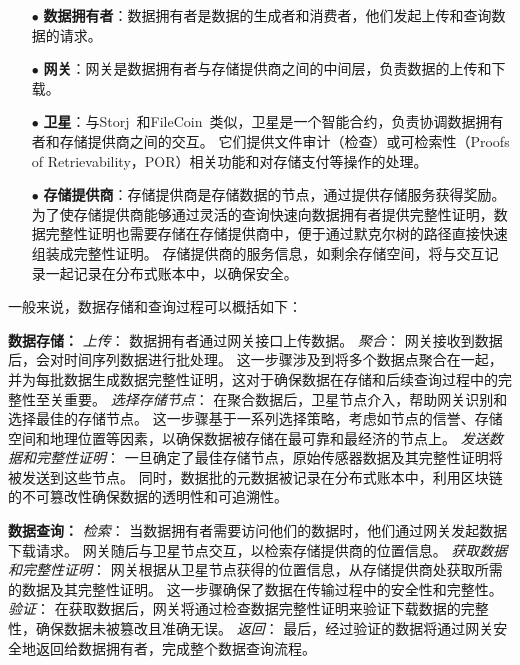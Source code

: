 \begin{itemize}
    \item[$\bullet$] \textbf{数据拥有者}：数据拥有者是数据的生成者和消费者，他们发起上传和查询数据的请求。
    \item[$\bullet$] \textbf{网关}：网关是数据拥有者与存储提供商之间的中间层，负责数据的上传和下载。
    \item[$\bullet$] \textbf{卫星}：与Storj~\cite{storj2018storj}和FileCoin~\cite{bauer2022filecoin}类似，卫星是一个智能合约，负责协调数据拥有者和存储提供商之间的交互。
    它们提供文件审计（检查）或可检索性（Proofs of Retrievability，POR）相关功能和对存储支付等操作的处理。
    \item[$\bullet$] \textbf{存储提供商}：存储提供商是存储数据的节点，通过提供存储服务获得奖励。
    为了使存储提供商能够通过灵活的查询快速向数据拥有者提供完整性证明，数据完整性证明也需要存储在存储提供商中，便于通过默克尔树的路径直接快速组装成完整性证明。
    存储提供商的服务信息，如剩余存储空间，将与交互记录一起记录在分布式账本中，以确保安全。
\end{itemize}

一般来说，数据存储和查询过程可以概括如下：

\textbf{数据存储：}
\textit{上传}：
数据拥有者通过网关接口上传数据。
\textit{聚合}：
网关接收到数据后，会对时间序列数据进行批处理。
这一步骤涉及到将多个数据点聚合在一起，并为每批数据生成数据完整性证明，这对于确保数据在存储和后续查询过程中的完整性至关重要。
\textit{选择存储节点}：
在聚合数据后，卫星节点介入，帮助网关识别和选择最佳的存储节点。
这一步骤基于一系列选择策略，考虑如节点的信誉、存储空间和地理位置等因素，以确保数据被存储在最可靠和最经济的节点上。
\textit{发送数据和完整性证明}：
一旦确定了最佳存储节点，原始传感器数据及其完整性证明将被发送到这些节点。
同时，数据批的元数据被记录在分布式账本中，利用区块链的不可篡改性确保数据的透明性和可追溯性。

\textbf{数据查询：}
\textit{检索}：
当数据拥有者需要访问他们的数据时，他们通过网关发起数据下载请求。
网关随后与卫星节点交互，以检索存储提供商的位置信息。
\textit{获取数据和完整性证明}：
网关根据从卫星节点获得的位置信息，从存储提供商处获取所需的数据及其完整性证明。
这一步骤确保了数据在传输过程中的安全性和完整性。
\textit{验证}：
在获取数据后，网关将通过检查数据完整性证明来验证下载数据的完整性，确保数据未被篡改且准确无误。
\textit{返回}：
最后，经过验证的数据将通过网关安全地返回给数据拥有者，完成整个数据查询流程。

